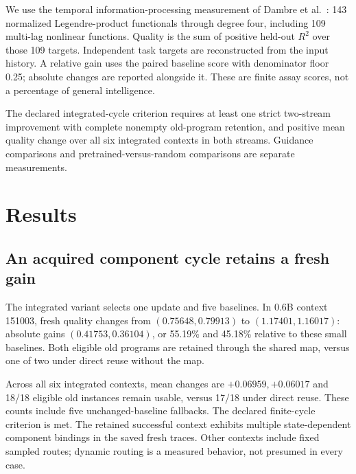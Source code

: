 \documentclass[11pt]{article}
\begin{document}
We use the temporal information-processing measurement of Dambre et al.~\cite{dambre}: 143 normalized Legendre-product functionals through degree four, including 109 multi-lag nonlinear functions. Quality is the sum of positive held-out $R^2$ over those 109 targets. Independent task targets are reconstructed from the input history. A relative gain uses the paired baseline score with denominator floor 0.25; absolute changes are reported alongside it. These are finite assay scores, not a percentage of general intelligence.

The declared integrated-cycle criterion requires at least one strict two-stream improvement with complete nonempty old-program retention, and positive mean quality change over all six integrated contexts in both streams. Guidance comparisons and pretrained-versus-random comparisons are separate measurements.

\section{Results}
\subsection{An acquired component cycle retains a fresh gain}
The integrated variant selects one update and five baselines. In 0.6B context 151003, fresh quality changes from $(0.75648,0.79913)$ to $(1.17401,1.16017)$: absolute gains $(0.41753,0.36104)$, or 55.19\% and 45.18\% relative to these small baselines. Both eligible old programs are retained through the shared map, versus one of two under direct reuse without the map.

Across all six integrated contexts, mean changes are $+0.06959,+0.06017$ and 18/18 eligible old instances remain usable, versus 17/18 under direct reuse. These counts include five unchanged-baseline fallbacks. The declared finite-cycle criterion is met. The retained successful context exhibits multiple state-dependent component bindings in the saved fresh traces. Other contexts include fixed sampled routes; dynamic routing is a measured behavior, not presumed in every case.

\begin{table}[ht]\centering\small
\caption{All six contexts per variant. Quality changes include baseline fallbacks. Old denotes intersection retention across both fresh blocks. Each control acquires its own return, so starting qualities differ.}\label{tab:aggregate}
\end{table}
\end{document}
